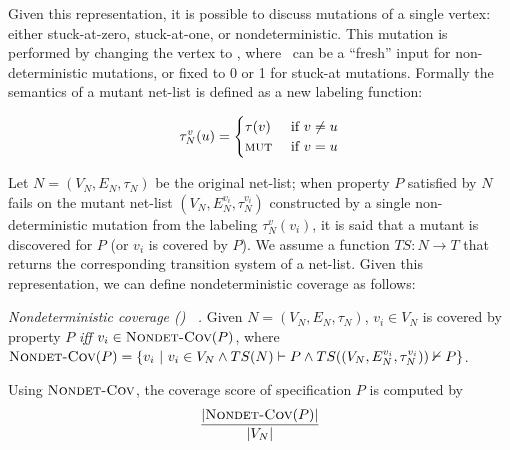 Given this representation, it is possible to discuss mutations of a single vertex: either stuck-at-zero, stuck-at-one, or nondeterministic.  This mutation is performed by changing the vertex to \mutnode, where \mutnode\ can be a ``fresh'' input for non-deterministic mutations, or fixed to 0 or 1 for stuck-at mutations. Formally the semantics of a mutant net-list is defined as a new labeling function:

\[ \tau^{v}_{N}(u) = \begin{cases}
    \tau(v) & \textrm{ if $v \neq u$} \\
    \textrm{{\sc mut}}   & \textrm{ if $v = u$}
\end{cases}  \]
\noindent


Let  $N = (V_N,E_N, \tau_N)$ be the original net-list;
when property $P$ satisfied by $N$ fails on the mutant net-list $(V_N, E^{v_i}_N, \tau^{v_i}_{N})$ constructed by a single non-deterministic mutation from the labeling $\tau^{v}_{N}(v_i)$, it is said that a mutant is discovered for $P$ (or $v_i$ is covered by $P$).
We assume a function $TS : N \rightarrow T$ that returns the corresponding transition system of a net-list.  
Given this representation, we can define nondeterministic coverage as follows:

\begin{definition} {\emph{Nondeterministic coverage (\nondetcov) ~\cite{chockler2010coverage}.} }
\label{def:non-det}
Given $N = (V_N,E_N, \tau_N)$,
$v_i \in V_N$ is covered by property $P$ \emph{iff} $v_i \in \text{\sc Nondet-Cov} (P)$, where
$\text{\sc Nondet-Cov} (P) = \{ v_i~|~ v_i \in V_N \wedge TS(N) \vdash P \wedge TS((V_N, E^{v_i}_N, \tau^{v_i}_{N})) \nvdash P \}$.
\end{definition}
Using  $\text{\sc Nondet-Cov}$, the coverage score of specification $P$ is computed by
\[
   \frac{ | \text{\sc Nondet-Cov} (P) |}{|V_N|}
\]


